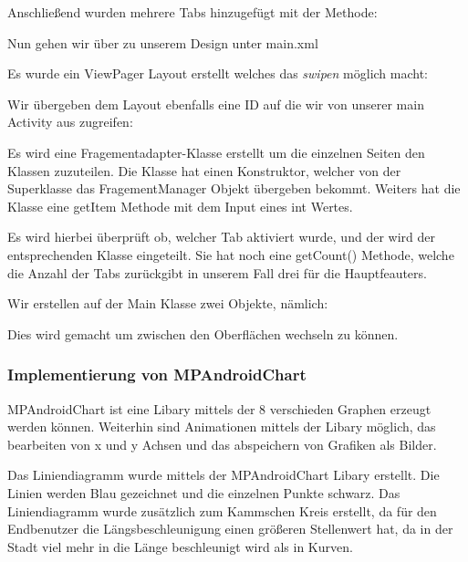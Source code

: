 Anschließend wurden mehrere Tabs hinzugefügt mit der Methode:




Nun gehen wir über zu unserem Design unter main.xml

Es wurde ein ViewPager Layout erstellt welches das \textit{swipen} möglich macht:



Wir übergeben dem Layout ebenfalls eine ID auf die wir von unserer main Activity aus zugreifen: 




Es wird eine Fragementadapter-Klasse erstellt um die einzelnen Seiten den Klassen zuzuteilen. 
Die Klasse hat einen Konstruktor, welcher von der Superklasse das FragementManager Objekt übergeben bekommt.
Weiters hat die Klasse eine getItem Methode mit dem Input eines int Wertes. 



Es wird hierbei überprüft ob, welcher Tab aktiviert wurde, und der wird der entsprechenden Klasse eingeteilt. 
Sie hat noch eine getCount() Methode, welche die Anzahl der Tabs zurückgibt in unserem Fall drei für die Hauptfeauters.


Wir erstellen auf der Main Klasse zwei Objekte, nämlich:


Dies wird gemacht um zwischen den Oberflächen wechseln zu können.

 

\subsubsection*{Implementierung von MPAndroidChart}
MPAndroidChart ist eine Libary mittels der 8 verschieden Graphen erzeugt werden können. Weiterhin sind Animationen mittels der Libary möglich, das bearbeiten von x und y Achsen und das abspeichern von Grafiken als Bilder.

Das Liniendiagramm wurde mittels der MPAndroidChart Libary erstellt. Die Linien werden Blau gezeichnet und die einzelnen Punkte schwarz. Das Liniendiagramm wurde zusätzlich zum Kammschen Kreis erstellt, da für den Endbenutzer die Längsbeschleunigung einen größeren Stellenwert hat, da in der Stadt viel mehr in die Länge beschleunigt wird als in Kurven.

